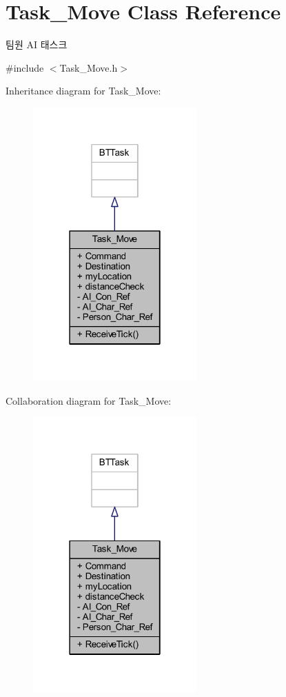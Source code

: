 \hypertarget{class_task___move}{}\section{Task\+\_\+\+Move Class Reference}
\label{class_task___move}


팀원 AI 태스크  




{\ttfamily \#include $<$Task\+\_\+\+Move.\+h$>$}



Inheritance diagram for Task\+\_\+\+Move\+:
\nopagebreak
\begin{figure}[H]
\begin{center}
\leavevmode
\includegraphics[width=178pt]{class_task___move__inherit__graph}
\end{center}
\end{figure}


Collaboration diagram for Task\+\_\+\+Move\+:
\nopagebreak
\begin{figure}[H]
\begin{center}
\leavevmode
\includegraphics[width=178pt]{class_task___move__coll__graph}
\end{center}
\end{figure}
